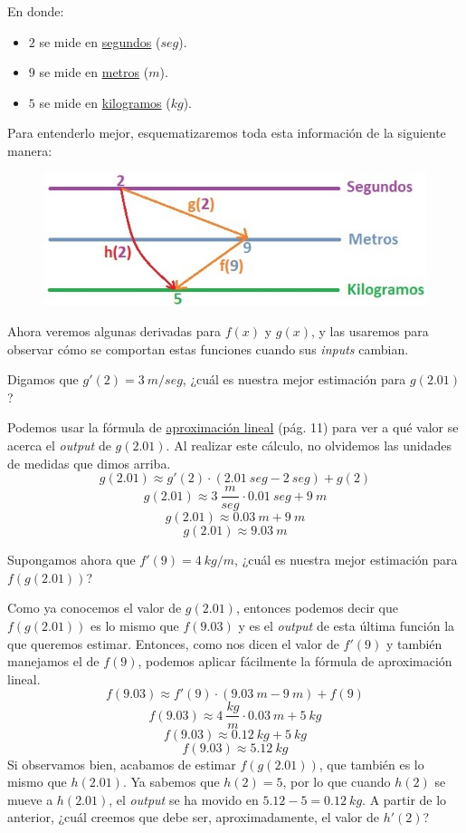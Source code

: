 \documentclass[12pt]{article}
\begin{document}
En donde:

\begin{itemize}
\item $2$ se mide en \underline{segundos} ($seg$).
\item $9$ se mide en \underline{metros} ($m$).
\item $5$ se mide en \underline{kilogramos} ($kg$).
\end{itemize}

Para entenderlo mejor, esquematizaremos toda esta información de la siguiente manera:

\begin{figure}[hbt!]
\centering
\includegraphics[scale=0.7]{img/intro-chain-rule.jpg}
\end{figure}

Ahora veremos algunas derivadas para $f(x)$ y $g(x)$, y las usaremos para observar cómo se comportan estas funciones cuando sus \textit{inputs} cambian.

Digamos que $g'(2) = 3 \ m/seg$, ¿cuál es nuestra mejor estimación para $g(2.01)$?

Podemos usar la fórmula de \underline{aproximación lineal} (pág. 11) para ver a qué valor se acerca el \textit{output} de $g(2.01)$. Al realizar este cálculo, no olvidemos las unidades de medidas que dimos arriba.
\[g(2.01) \approx g'(2) \cdot (2.01 \ seg - 2 \ seg) + g(2)\]
\[g(2.01) \approx 3 \ \frac{m}{seg} \cdot 0.01 \ seg + 9 \ m\]
\[g(2.01) \approx 0.03 \ m + 9 \ m\]
\[g(2.01) \approx 9.03 \ m\]

Supongamos ahora que $f'(9) = 4 \ kg/m$, ¿cuál es nuestra mejor estimación para $f(g(2.01))$?

Como ya conocemos el valor de $g(2.01)$, entonces podemos decir que $f(g(2.01))$ es lo mismo que $f(9.03)$ y es el \textit{output} de esta última función la que queremos estimar. Entonces, como nos dicen el valor de $f'(9)$ y también manejamos el de $f(9)$, podemos aplicar fácilmente la fórmula de aproximación lineal.
\[f(9.03) \approx f'(9) \cdot (9.03 \ m - 9 \ m) + f(9)\]
\[f(9.03) \approx 4 \ \frac{kg}{m} \cdot 0.03 \ m + 5 \ kg\]
\[f(9.03) \approx 0.12 \ kg + 5 \ kg\]
\[f(9.03) \approx 5.12 \ kg\]
Si observamos bien, acabamos de estimar $f(g(2.01))$, que también es lo mismo que $h(2.01)$. Ya sabemos que $h(2) = 5$, por lo que cuando $h(2)$ se mueve a $h(2.01)$, el \textit{output} se ha movido en $5.12-5 = 0.12 \ kg$. A partir de lo anterior, ¿cuál creemos que debe ser, aproximadamente, el valor de $h'(2)$?
\end{document}
